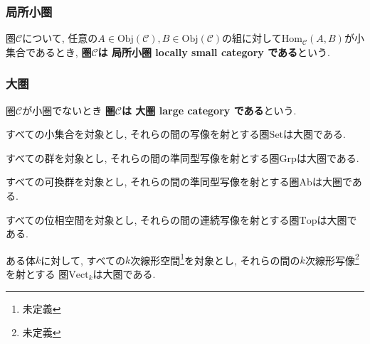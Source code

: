 \subsubsection{局所小圏}
\begin{Def}
圏$\mathscr{C}$について, 任意の$A\in\mathrm{Obj}(\mathscr{C}),B\in\mathrm{Obj}(\mathscr{C})$の組に対して$\mathrm{Hom}_{\mathscr{C}}(A,B)$が小集合であるとき, 
{\bf 圏$\mathscr{C}$は 
局所小圏 locally small category 
である}という.
\end{Def}
\subsubsection{大圏}
\begin{Def}
圏$\mathscr{C}$が小圏でないとき
{\bf 圏$\mathscr{C}$は
大圏 large category
である}という.
\end{Def}

\begin{Prop}\label{Prop:large category Set}
すべての小集合を対象とし, それらの間の写像を射とする圏$\mathrm{Set}$は大圏である.
\end{Prop}

\begin{Prop}\label{Prop:large category Grp}
すべての群を対象とし, それらの間の準同型写像を射とする圏$\mathrm{Grp}$は大圏である.
\end{Prop}

\begin{Prop}\label{Prop:large category Ab}
すべての可換群を対象とし, それらの間の準同型写像を射とする圏$\mathrm{Ab}$は大圏である.
\end{Prop}

\begin{Prop}
すべての位相空間を対象とし, それらの間の連続写像を射とする圏$\mathrm{Top}$は大圏である.
\end{Prop}

\begin{example}
ある体$k$に対して,
すべての$k$次線形空間\footnote{未定義}を対象とし,
それらの間の$k$次線形写像\footnote{未定義}を射とする
圏$\mathrm{Vect}_k$は大圏である.
\end{example}

